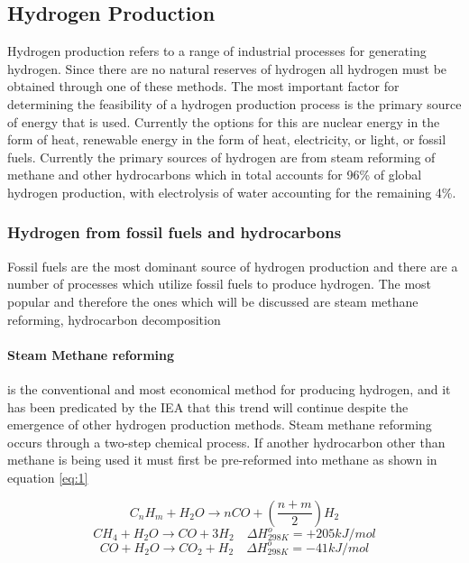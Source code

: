 \subsection{Hydrogen Production}
Hydrogen production refers to a range of industrial processes for generating hydrogen. 
Since there are no natural reserves of hydrogen all hydrogen must be obtained through one of these methods. 
The most important factor for determining the feasibility of a hydrogen production process is the primary 
source of energy that is used. Currently the options for this are nuclear energy in the form of heat, 
renewable energy in the form of heat, electricity, or light, or fossil fuels. 
Currently the primary sources of hydrogen are from steam reforming of methane and other hydrocarbons which 
in total accounts for 96\% of global hydrogen production, with electrolysis of water accounting for the 
remaining 4\%.
\subsubsection{Hydrogen from fossil fuels and hydrocarbons}
Fossil fuels are the most dominant source of hydrogen production and there are a number of processes which 
utilize fossil fuels to produce hydrogen. The most popular and therefore the ones which will be discussed 
are steam methane reforming, hydrocarbon decomposition
\paragraph{Steam Methane reforming}
is the conventional and most economical method for producing hydrogen, and it has been predicated by the 
IEA that this trend will continue despite the emergence of other hydrogen production methods. 
Steam methane reforming occurs through a two-step chemical process. If another hydrocarbon other than 
methane is being used it must first be pre-reformed into methane as shown in equation \ref{eq:1}

\begin{equation} \label{eq:1}
    C_n H_m + H_2 O \rightarrow nCO +(\frac{n+m}{2})H_2 
\end{equation}
\begin{equation}\label{eq:2}
    CH_4 + H_2 O \rightarrow CO + 3H_2 \quad \Delta H_{298K}^o = +205 kJ/mol
\end{equation}
\begin{equation}\label{eq:3}
    CO+ H_2 O \rightarrow CO_2 + H_2 \quad \Delta H_{298K}^o = -41 kJ/mol
\end{equation}

